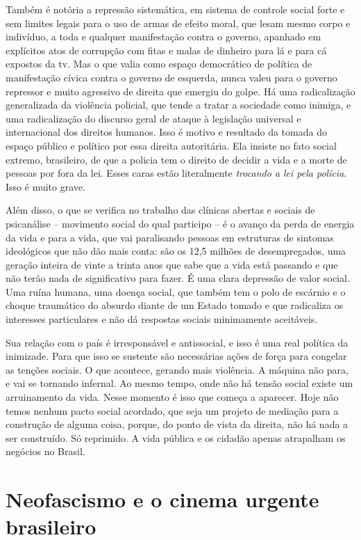 Também é notória a repressão sistemática, em sistema de controle social
forte e sem limites legais para o uso de armas de efeito moral, que
lesam mesmo corpo e indivíduo, a toda e qualquer manifestação contra o
governo, apanhado em explícitos atos de corrupção com fitas e malas de
dinheiro para lá e para cá expostos da tv. Mas o que valia como espaço
democrático de política de manifestação cívica contra o governo de
esquerda, nunca valeu para o governo repressor e muito agressivo de
direita que emergiu do golpe. Há uma radicalização generalizada da
violência policial, que tende a tratar a sociedade como inimiga, e uma
radicalização do discurso geral de ataque à legislação universal e
internacional dos direitos humanos. Isso é motivo e resultado da tomada
do espaço público e político por essa direita autoritária. Ela insiste
no fato social extremo, brasileiro, de que a policia tem o direito de
decidir a vida e a morte de pessoas por fora da lei. Esses caras estão
literalmente \emph{trocando a lei pela polícia}. Isso é muito grave.

Além disso, o que se verifica no trabalho das clínicas abertas e sociais
de psicanálise -- movimento social do qual participo -- é o avanço da
perda de energia da vida e para a vida, que vai paralisando pessoas em
estruturas de sintomas ideológicos que não dão mais conta: são os 12,5 milhões
de desempregados, uma geração inteira de vinte a trinta anos que sabe
que a vida está passando e que não terão nada de significativo para
fazer. É uma clara depressão de valor social. Uma ruína humana, uma
doença social, que também tem o polo de escárnio e o choque traumático
do absurdo diante de um Estado tomado e que radicaliza os interesses
particulares e não dá respostas sociais minimamente aceitáveis.

Sua relação com o país é irresponsável e antissocial, e isso é uma real
política da inimizade. Para que isso se sustente são necessárias ações
de força para congelar as tenções sociais. O que acontece, gerando mais
violência. A máquina não para, e vai se tornando infernal. Ao mesmo
tempo, onde não há tensão social existe um arruinamento da vida. Nesse
momento é isso que começa a aparecer. Hoje não temos nenhum pacto social
acordado, que seja um projeto de mediação para a construção de alguma
coisa, porque, do ponto de vista da direita, não há nada a ser
construído. Só reprimido. A vida pública e os cidadão apenas atrapalham
os negócios no Brasil.

\chapter{Neofascismo e o cinema urgente brasileiro }

